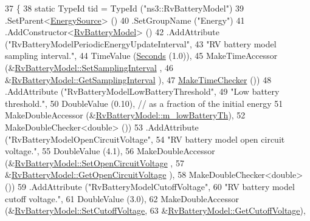 \begin{DoxyCode}
37 \{
38   \textcolor{keyword}{static} TypeId tid = TypeId (\textcolor{stringliteral}{"ns3::RvBatteryModel"})
39     .SetParent<\hyperlink{classns3_1_1EnergySource_a820794a417c3d2f7909f987ba6064cde}{EnergySource}> ()
40     .SetGroupName (\textcolor{stringliteral}{"Energy"})
41     .AddConstructor<\hyperlink{classns3_1_1RvBatteryModel_ae88b599d504056559bf2de38391a17da}{RvBatteryModel}> ()
42     .AddAttribute (\textcolor{stringliteral}{"RvBatteryModelPeriodicEnergyUpdateInterval"},
43                    \textcolor{stringliteral}{"RV battery model sampling interval."},
44                    TimeValue (\hyperlink{group__timecivil_ga33c34b816f8ff6628e33d5c8e9713b9e}{Seconds} (1.0)),
45                    MakeTimeAccessor (&\hyperlink{classns3_1_1RvBatteryModel_a45087cd749937bacfcf3ba43b5ddb538}{RvBatteryModel::SetSamplingInterval}
      ,
46                                      &\hyperlink{classns3_1_1RvBatteryModel_a9eb804d6f04de072b6f108c4aff55257}{RvBatteryModel::GetSamplingInterval}
      ),
47                    \hyperlink{group__time_ga7032965bd4afa578691d88c09e4481c1}{MakeTimeChecker} ())
48     .AddAttribute (\textcolor{stringliteral}{"RvBatteryModelLowBatteryThreshold"},
49                    \textcolor{stringliteral}{"Low battery threshold."},
50                    DoubleValue (0.10), \textcolor{comment}{// as a fraction of the initial energy}
51                    MakeDoubleAccessor (&\hyperlink{classns3_1_1RvBatteryModel_a01e8c3b6a4ff1b066d2fe0271c216007}{RvBatteryModel::m\_lowBatteryTh}),
52                    MakeDoubleChecker<double> ())
53     .AddAttribute (\textcolor{stringliteral}{"RvBatteryModelOpenCircuitVoltage"},
54                    \textcolor{stringliteral}{"RV battery model open circuit voltage."},
55                    DoubleValue (4.1),
56                    MakeDoubleAccessor (&\hyperlink{classns3_1_1RvBatteryModel_ab086a0fa60589b1232125e9fd183c1b9}{RvBatteryModel::SetOpenCircuitVoltage}
      ,
57                                        &\hyperlink{classns3_1_1RvBatteryModel_a0040c91bbfaccac6cf549bafc6acfd11}{RvBatteryModel::GetOpenCircuitVoltage}
      ),
58                    MakeDoubleChecker<double> ())
59     .AddAttribute (\textcolor{stringliteral}{"RvBatteryModelCutoffVoltage"},
60                    \textcolor{stringliteral}{"RV battery model cutoff voltage."},
61                    DoubleValue (3.0),
62                    MakeDoubleAccessor (&\hyperlink{classns3_1_1RvBatteryModel_a70d08fb3ddebd46b0ce0daae98af79e6}{RvBatteryModel::SetCutoffVoltage},
63                                        &\hyperlink{classns3_1_1RvBatteryModel_a2c6e69ca6fc5f9f12cc3cabe3ff2f3d7}{RvBatteryModel::GetCutoffVoltage}),

\end{DoxyCode}

